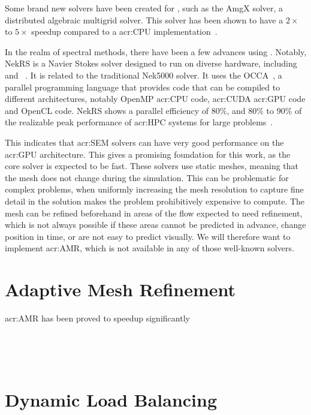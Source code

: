 Some brand new solvers have been created for , such as the AmgX solver, a
distributed algebraic multigrid solver. This solver has been shown to have a \(2 \times \) to \(5
\times \) speedup compared to a \acrshort{acr:CPU} implementation~\cite{Naumov2015}.

In the realm of spectral methods, there have been a few advances using .
Notably, NekRS is a Navier Stokes solver designed to run on diverse hardware, including
 and ~\cite{Fischer2021}. It is related to the traditional
Nek5000 solver. It uses the OCCA~\cite{Medina2014}, a parallel programming language that provides
code that can be compiled to different architectures, notably OpenMP \acrshort{acr:CPU} code,
\acrshort{acr:CUDA} \acrshort{acr:GPU} code and OpenCL code. NekRS shows a parallel efficiency of
\(80 \% \), and \(80 \% \) to \(90 \% \) of the realizable peak performance of \acrshort{acr:HPC}
systems for large problems~\cite{Fischer2021}.

This indicates that \acrshort{acr:SEM} solvers can have very good performance on the
\acrshort{acr:GPU} architecture. This gives a promising foundation for this work, as the core solver
is expected to be fast. These solvers use static meshes, meaning that the mesh does not change
during the simulation. This can be problematic for complex problems, when uniformly increasing the
mesh resolution to capture fine detail in the solution makes the problem prohibitively expensive to
compute. The mesh can be refined beforehand in areas of the flow expected to need refinement, which
is not always possible if these areas cannot be predicted in advance, change position in time, or
are not easy to predict visually. We will therefore want to implement \acrlong{acr:AMR}, which is
not available in any of those well-known solvers.

\section{Adaptive Mesh Refinement}\label{section:literature_review:amr}

\Acrshort{acr:AMR} has been proved to speedup significantly 

~\cite{Plewa2005} %


~\cite{Schive2018} %
~\cite{Giuliani2019} %

\section{Dynamic Load Balancing}\label{section:literature_review:load_balancing}
